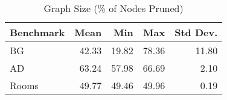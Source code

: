 \begin{table}[ht]
\caption{Graph Size (\% of Nodes Pruned)}
  \label{table-graphsize}
\begin{center}
\begin{tabular}{lrrrr}
\hline
Benchmark &  Mean  & Min  & Max & Std Dev.  \\ 
\hline
BG & 42.33 & 19.82 & 78.36 & 11.80 \\ 
AD & 63.24 & 57.98 & 66.69 & 2.10 \\ 
Rooms & 49.77 & 49.46 & 49.96 & 0.19 \\ 
\hline
\end{tabular}
\end{center}
\end{table}

